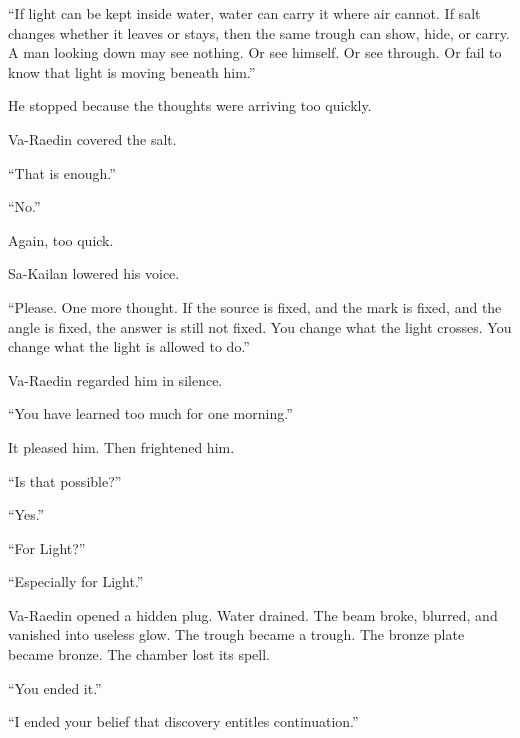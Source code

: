 “If light can be kept inside water, water can carry it where air cannot.
If salt changes whether it leaves or stays, then the same trough can show, hide, or carry.
A man looking down may see nothing.
Or see himself.
Or see through.
Or fail to know that light is moving beneath him.”\par

He stopped because the thoughts were arriving too quickly.\par

Va-Raedin covered the salt.\par

“That is enough.”\par

“No.”\par

Again, too quick.\par

Sa-Kailan lowered his voice.\par

“Please.
One more thought.
If the source is fixed, and the mark is fixed, and the angle is fixed, the answer is still not fixed.
You change what the light crosses.
You change what the light is allowed to do.”\par

Va-Raedin regarded him in silence.\par

“You have learned too much for one morning.”\par

It pleased him.
Then frightened him.\par

“Is that possible?”\par

“Yes.”\par

“For Light?”\par

“Especially for Light.”\par

Va-Raedin opened a hidden plug.
Water drained.
The beam broke, blurred, and vanished into useless glow.
The trough became a trough.
The bronze plate became bronze.
The chamber lost its spell.\par

“You ended it.”\par

“I ended your belief that discovery entitles continuation.”\par

